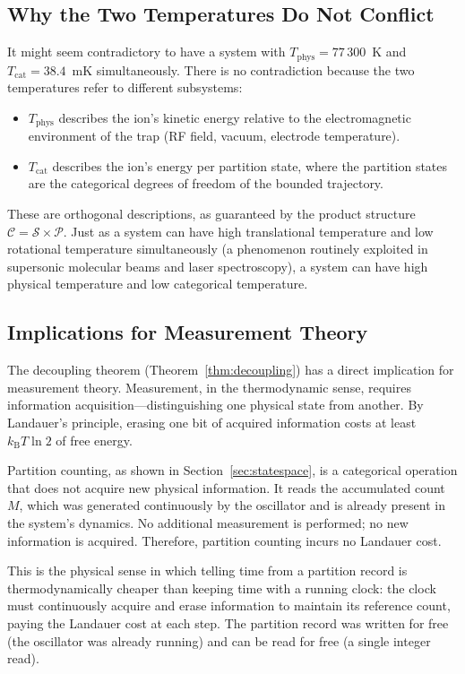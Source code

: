 \documentclass[twocolumn,10pt]{article}
\newcommand{\kB}{k_{\mathrm{B}}}
\newcommand{\Tcat}{T_{\mathrm{cat}}}
\newcommand{\Tphys}{T_{\mathrm{phys}}}
\begin{document}
\subsection{Why the Two Temperatures Do Not Conflict}

It might seem contradictory to have a system with $\Tphys = 77\,300$~K and $\Tcat = 38.4$~mK simultaneously. There is no contradiction because the two temperatures refer to different subsystems:

\begin{itemize}
    \item $\Tphys$ describes the ion's kinetic energy relative to the electromagnetic environment of the trap (RF field, vacuum, electrode temperature).
    \item $\Tcat$ describes the ion's energy per partition state, where the partition states are the categorical degrees of freedom of the bounded trajectory.
\end{itemize}

These are orthogonal descriptions, as guaranteed by the product structure $\mathcal{C} = \mathcal{S} \times \mathcal{P}$. Just as a system can have high translational temperature and low rotational temperature simultaneously (a phenomenon routinely exploited in supersonic molecular beams and laser spectroscopy), a system can have high physical temperature and low categorical temperature.

\subsection{Implications for Measurement Theory}

The decoupling theorem (Theorem~\ref{thm:decoupling}) has a direct implication for measurement theory. Measurement, in the thermodynamic sense, requires information acquisition---distinguishing one physical state from another. By Landauer's principle, erasing one bit of acquired information costs at least $\kB T \ln 2$ of free energy.

Partition counting, as shown in Section~\ref{sec:statespace}, is a categorical operation that does not acquire new physical information. It reads the accumulated count $M$, which was generated continuously by the oscillator and is already present in the system's dynamics. No additional measurement is performed; no new information is acquired. Therefore, partition counting incurs no Landauer cost.

This is the physical sense in which telling time from a partition record is thermodynamically cheaper than keeping time with a running clock: the clock must continuously acquire and erase information to maintain its reference count, paying the Landauer cost at each step. The partition record was written for free (the oscillator was already running) and can be read for free (a single integer read).
\end{document}
